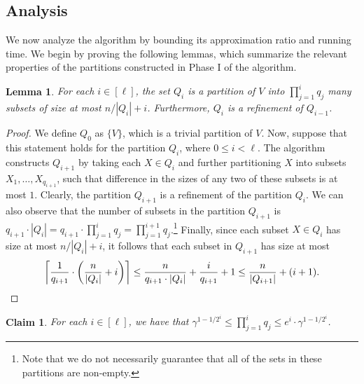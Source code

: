 \documentclass[11pt]{article}
\newcommand{\1}{\mathmybb{1}}
\newtheorem{lemma}[theorem]{Lemma}
\newtheorem{claim}[theorem]{Claim}
\begin{document}
\subsection{Analysis}

We now analyze the algorithm by bounding its approximation ratio and running time. We begin by proving the following lemmas, which summarize the relevant properties of the partitions constructed in Phase I of the algorithm.

\begin{lemma}\label{lem:partitions}
    For each $i \in [\ell]$, the set $Q_i$ is a partition of $V$ into $\prod_{j=1}^i q_j$ many subsets of size at most $n/|Q_i| + i$. Furthermore, $Q_i$ is a refinement of $Q_{i-1}$.
\end{lemma}

\begin{proof}
    We define $Q_0$ as $\{V\}$, which is a trivial partition of $V$. Now, suppose that this statement holds for the partition $Q_i$, where $0 \leq i < \ell$. The algorithm constructs $Q_{i+1}$ by taking each $X \in Q_i$ and further partitioning $X$ into subsets $X_1,\dots,X_{q_{i+1}}$, such that difference in the sizes of any two of these subsets is at most $1$. Clearly, the partition $Q_{i+1}$ is a refinement of the partition $Q_i$. We can also observe that the number of subsets in the partition $Q_{i+1}$ is $q_{i+1} \cdot |Q_{i}| = q_{i+1} \cdot \prod_{j=1}^i q_j = \prod_{j=1}^{i+1} q_j$.\footnote{Note that we do not necessarily guarantee that all of the sets in these partitions are non-empty.} Finally, since each subset $X \in Q_i$ has size at most $n/|Q_i| + i$, it follows that each subset in $Q_{i+1}$ has size at most
    $$ \left\lceil \frac{1}{q_{i+1}} \cdot \left( \frac{n}{|Q_i|} + i \right) \right\rceil \leq \frac{n}{q_{i+1} \cdot |Q_i|} + \frac{i}{q_{i+1}} + 1 \leq \frac{n}{|Q_{i+1}|} + (i+1).\qedhere $$
\end{proof}

\begin{claim}\label{app:lem:prod q}
    For each $i \in [\ell]$, we have that $\gamma^{1 - 1/2^i} \leq \prod_{j=1}^i q_j \leq e^i \cdot \gamma^{1 - 1/2^i}$.
\end{claim}
\end{document}
